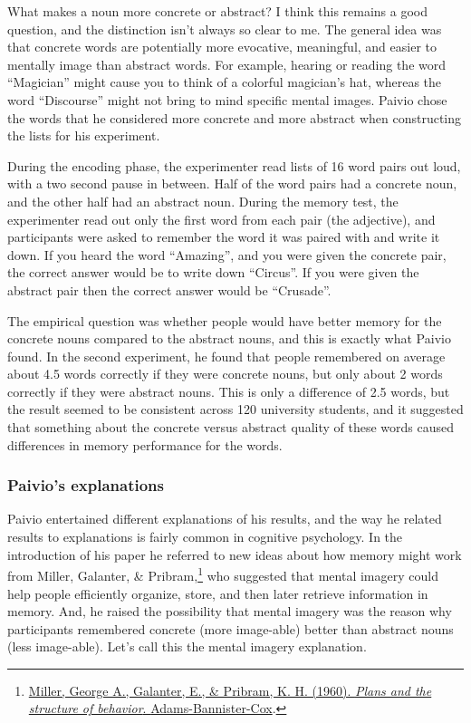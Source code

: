 \documentclass[
  oneside,
  12pt]{crumpbook}
\begin{document}
What makes a noun more concrete or abstract? I think this remains a good question, and the distinction isn't always so clear to me. The general idea was that concrete words are potentially more evocative, meaningful, and easier to mentally image than abstract words. For example, hearing or reading the word ``Magician'' might cause you to think of a colorful magician's hat, whereas the word ``Discourse'' might not bring to mind specific mental images. Paivio chose the words that he considered more concrete and more abstract when constructing the lists for his experiment.

During the encoding phase, the experimenter read lists of 16 word pairs out loud, with a two second pause in between. Half of the word pairs had a concrete noun, and the other half had an abstract noun. During the memory test, the experimenter read out only the first word from each pair (the adjective), and participants were asked to remember the word it was paired with and write it down. If you heard the word ``Amazing'', and you were given the concrete pair, the correct answer would be to write down ``Circus''. If you were given the abstract pair then the correct answer would be ``Crusade''.

The empirical question was whether people would have better memory for the concrete nouns compared to the abstract nouns, and this is exactly what Paivio found. In the second experiment, he found that people remembered on average about 4.5 words correctly if they were concrete nouns, but only about 2 words correctly if they were abstract nouns. This is only a difference of 2.5 words, but the result seemed to be consistent across 120 university students, and it suggested that something about the concrete versus abstract quality of these words caused differences in memory performance for the words.

\hypertarget{paivios-explanations}{%
\subsubsection{Paivio's explanations}\label{paivios-explanations}}

Paivio entertained different explanations of his results, and the way he related results to explanations is fairly common in cognitive psychology. In the introduction of his paper he referred to new ideas about how memory might work from Miller, Galanter, \& Pribram,\footnote{\protect\hyperlink{ref-millerPlansStructureBehavior1960}{Miller, George A., Galanter, E., \& Pribram, K. H. (1960). \emph{Plans and the structure of behavior}. {Adams-Bannister-Cox}}.} who suggested that mental imagery could help people efficiently organize, store, and then later retrieve information in memory. And, he raised the possibility that mental imagery was the reason why participants remembered concrete (more image-able) better than abstract nouns (less image-able). Let's call this the mental imagery explanation.
\end{document}
